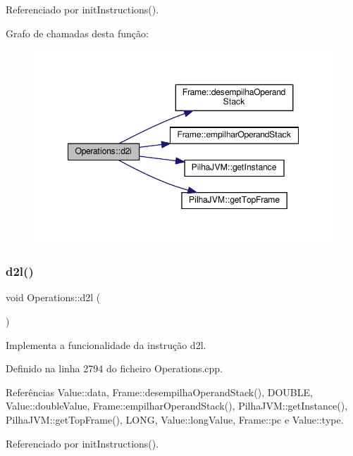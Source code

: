 Referenciado por init\+Instructions().

Grafo de chamadas desta função\+:\nopagebreak
\begin{figure}[H]
\begin{center}
\leavevmode
\includegraphics[width=348pt]{classOperations_aa8cda1c04343e047078b72b51c575e1c_cgraph}
\end{center}
\end{figure}
\mbox{\label{classOperations_a2babf3c9e2ac30a70a07f8d43b32440a}} 
\subsubsection{\texorpdfstring{d2l()}{d2l()}}
{\footnotesize\ttfamily void Operations\+::d2l (\begin{DoxyParamCaption}{ }\end{DoxyParamCaption})\hspace{0.3cm}{\ttfamily [private]}}



Implementa a funcionalidade da instrução d2l. 



Definido na linha 2794 do ficheiro Operations.\+cpp.



Referências Value\+::data, Frame\+::desempilha\+Operand\+Stack(), D\+O\+U\+B\+LE, Value\+::double\+Value, Frame\+::empilhar\+Operand\+Stack(), Pilha\+J\+V\+M\+::get\+Instance(), Pilha\+J\+V\+M\+::get\+Top\+Frame(), L\+O\+NG, Value\+::long\+Value, Frame\+::pc e Value\+::type.



Referenciado por init\+Instructions().

